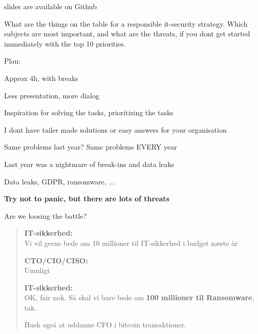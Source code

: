 \documentclass[Screen16to9,17pt]{foils}
\begin{document}


\vskip 1cm
\centerline{\footnotesize slides are available on Github}


What are the things on the table for a responsible it-security strategy. Which subjects are most important, and what are the threats, if you dont get started immediately with the top 10 priorities.


\begin{list2}
\item Plan:
\item Approx 4h, with breaks
\item Less presentation, more dialog
\item Inspiration for solving the tasks, prioritizing the tasks
\item I dont have tailer made solutions or easy answers for your organisation
\end{list2}




\begin{list2}
\item Same problems last year? Same problems EVERY year
\item Last year was a nightmare of break-ins and data leaks
\item Data leaks, GDPR, ransomware, ...
\end{list2}

\vskip 1cm
{\LARGE\bf Try not to panic, but there are lots of threats}

Are we loosing the battle?



\begin{quote}\large
{\bf IT-sikkerhed:}\\
Vi vil gerne bede om 10 millioner til IT-sikkerhed i budget næste år

{\bf CTO/CIO/CISO:}\\
Umuligt

{\bf IT-sikkerhed:}\\
OK, fair nok. Så skal vi bare bede om {\bf 100 millioner til Ransomware}, tak.

Husk også at uddanne CFO i bitcoin transaktioner.
\end{quote}
\end{document}
